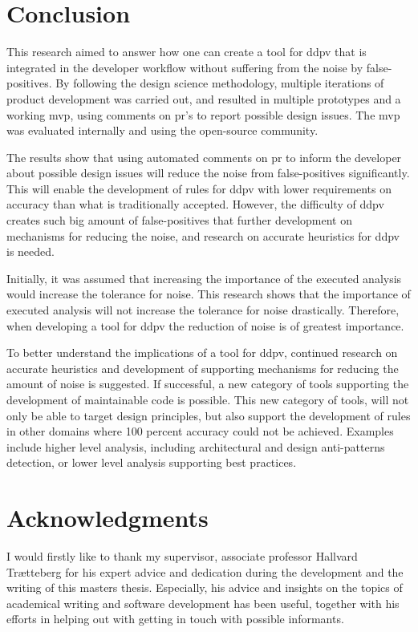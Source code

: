 \documentclass[pdftex,10pt,b5paper,twoside]{report}
\begin{document}
\section{Conclusion}
\label{conclusion}


This research aimed to answer how one can create a tool for \gls{ddpv} that is integrated in the developer workflow without suffering from the noise by false-positives. By following the design science methodology, multiple iterations of product development was carried out, and resulted in multiple prototypes and a working \gls{mvp}, using comments on \gls{pr}'s to report possible design issues. The \gls{mvp} was evaluated internally and using the open-source community. 


The results show that using automated comments on \gls{pr} to inform the developer about possible design issues will reduce the noise from false-positives significantly. This will enable the development of rules for \gls{ddpv} with lower requirements on accuracy than what is traditionally accepted. However, the difficulty of \gls{ddpv} creates such big amount of false-positives that further development on mechanisms for reducing the noise, and research on accurate heuristics for \gls{ddpv} is needed.

Initially, it was assumed that increasing the importance of the executed analysis would increase the tolerance for noise. This research shows that the importance of executed analysis will not increase the tolerance for noise drastically. Therefore, when developing a tool for \gls{ddpv} the reduction of noise is of greatest importance. 

To better understand the implications of a tool for \gls{ddpv}, continued research on accurate heuristics and development of supporting mechanisms for reducing the amount of noise is suggested. If successful, a new category of tools supporting the development of maintainable code is possible. This new category of tools, will not only be able to target design principles, but also support the development of rules in other domains where 100 percent accuracy could not be achieved. Examples include higher level analysis, including architectural and design anti-patterns detection, or lower level analysis supporting best practices.

\section{Acknowledgments}
\label{acknowledgements}
I would firstly like to thank my supervisor, associate professor Hallvard Trætteberg for his expert advice and dedication during the development and the writing of this masters thesis. Especially, his advice and insights on the topics of academical writing and software development has been useful, together with his efforts in helping out with getting in touch with possible informants.
\end{document}
